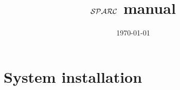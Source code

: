 \documentclass[12pt, letterpaper]{article}
\begin{document}
\newcommand{\hide}[1]{}
\newcommand{\exercise}[1]{}
\newcommand{\future}[1]{}
\newcommand{\otherquestions}[1]{}
\newcommand{\set}[1]{\{#1\}}
\newcommand{\pg}[1]{{\tt #1}}
\newtheorem{definition}{Definition}
\newcommand{\emptyclause}{\Box}
\def\st{\bigskip\noindent}
\newcommand{\lplus}
{
   \stackrel{+}{\gets}
}

\newcommand{\fe}[1] {
  \begin{frame}
    #1
  \end{frame}}

\newcommand{\eoa}{ {\bf End} of algorithm}

\newcommand{\ft}[1] {\frametitle{#1}}

\newcommand{\ie}[1] {
  \begin{itemize}
    #1
  \end{itemize}
}

\newcommand{\ee}[1] {
  \begin{enumerate}
    #1
  \end{enumerate}\label{marker}
}
\newcommand{\blk}[2] {
  \begin{block}{#1}
    #2
  \end{block}
}

\newtheorem{collorary}{Corollary}
\newtheorem{proposition}{Proposition}
\newtheorem{invariant}{Invariant}
\newtheorem{property}{Property}
\newtheorem{claim}{Claim}
\newtheorem{example}{Example}


\title{${\cal SPARC}$ manual}
\date{\today}
\maketitle
\tableofcontents
\pagebreak


\section{System installation}
\end{document}
